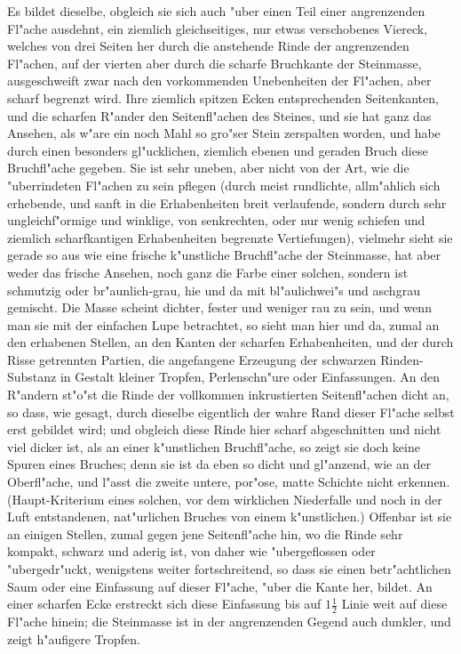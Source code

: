 \documentclass[a4paper, 11pt, oneside, german]{article}
\begin{document}
Es bildet dieselbe, obgleich sie sich auch "uber einen Teil einer angrenzenden Fl"ache ausdehnt, ein ziemlich gleichseitiges, nur etwas verschobenes Viereck, welches von drei Seiten her durch die anstehende Rinde der angrenzenden Fl"achen, auf der vierten aber durch die scharfe Bruchkante der Steinmasse, ausgeschweift zwar nach den vorkommenden Unebenheiten der Fl"achen, aber scharf begrenzt wird. Ihre ziemlich spitzen Ecken entsprechenden Seitenkanten, und die scharfen R"ander den Seitenfl"achen des Steines, und sie hat ganz das Ansehen, als w"are ein noch Mahl so gro"ser Stein zerspalten worden, und habe durch einen besonders gl"ucklichen, ziemlich ebenen und geraden Bruch diese Bruchfl"ache gegeben. Sie ist sehr uneben, aber nicht von der Art, wie die "uberrindeten Fl"achen zu sein pflegen (durch meist rundlichte, allm"ahlich sich erhebende, und sanft in die Erhabenheiten breit verlaufende, sondern durch sehr ungleichf"ormige und winklige, von senkrechten, oder nur wenig schiefen und ziemlich scharfkantigen Erhabenheiten begrenzte Vertiefungen), vielmehr sieht sie gerade so aus wie eine frische k"unstliche Bruchfl"ache der Steinmasse, hat aber weder das frische Ansehen, noch ganz die Farbe einer solchen, sondern ist schmutzig oder br"aunlich-grau, hie und da mit bl"aulichwei"s und aschgrau gemischt. Die Masse scheint dichter, fester und weniger rau zu sein, und wenn man sie mit der einfachen Lupe betrachtet, so sieht man hier und da, zumal an den erhabenen Stellen, an den Kanten der scharfen Erhabenheiten, und der durch Risse getrennten Partien, die angefangene Erzeugung der schwarzen Rinden-Substanz in Gestalt kleiner Tropfen, Perlenschn"ure oder Einfassungen. An den R"andern st"o"st die Rinde der vollkommen inkrustierten Seitenfl"achen dicht an, so dass, wie gesagt, durch dieselbe eigentlich der wahre Rand dieser Fl"ache selbst erst gebildet wird; und obgleich diese Rinde hier scharf abgeschnitten und nicht viel dicker ist, als an einer k"unstlichen Bruchfl"ache, so zeigt sie doch keine Spuren eines Bruches; denn sie ist da eben so dicht und gl"anzend, wie an der Oberfl"ache, und l"asst die zweite untere, por"ose, matte Schichte nicht erkennen. (Haupt-Kriterium eines solchen, vor dem wirklichen Niederfalle und noch in der Luft entstandenen, nat"urlichen Bruches von einem k"unstlichen.) Offenbar ist sie an einigen Stellen, zumal gegen jene Seitenfl"ache hin, wo die Rinde sehr kompakt, schwarz und aderig ist, von daher wie "ubergeflossen oder "ubergedr"uckt, wenigstens weiter fortschreitend, so dass sie einen betr"achtlichen Saum oder eine Einfassung auf dieser Fl"ache, "uber die Kante her, bildet. An einer scharfen Ecke erstreckt sich diese Einfassung bis auf $1\frac{1}{2}$ Linie weit auf diese Fl"ache hinein; die Steinmasse ist in der angrenzenden Gegend auch dunkler, und zeigt h"aufigere Tropfen.
\end{document}
